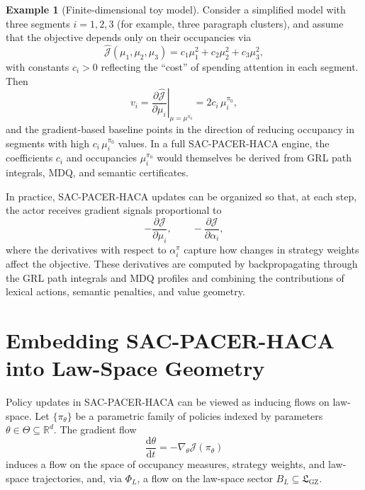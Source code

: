 \documentclass[11pt]{book}
\theoremstyle{plain}
\theoremstyle{definition}
\newtheorem{example}[theorem]{Example}
\theoremstyle{remark}
\newcommand{\GZLS}{\ensuremath{\mathfrak{L}_{\mathrm{GZ}}}}       \newcommand{\GZLT}{\ensuremath{M_{!w}}}                           \newcommand{\GZLOC}{\ensuremath{A_M}}                             \newcommand{\GZLC}{\ensuremath{\omega_{\mathrm{law}}}}            \newcommand{\GZLCurv}{\ensuremath{\mathcal{F}_{\mathrm{law}}}}
\begin{document}
\begin{example}[Finite-dimensional toy model]
\label{ex:toy-model-mu-v}
Consider a simplified model with three segments $i=1,2,3$ (for
example, three paragraph clusters), and assume that the objective
depends only on their occupancies via
\[
  \widehat{\mathcal{J}}(\mu_1,\mu_2,\mu_3)
  =
  c_1\mu_1^2 + c_2\mu_2^2 + c_3\mu_3^2,
\]
with constants $c_i>0$ reflecting the ``cost'' of spending attention
in each segment. Then
\[
  v_i
  =
  \left.\frac{\partial\widehat{\mathcal{J}}}{\partial\mu_i}\right|_{\mu=\mu^{\pi_0}}
  =
  2c_i\,\mu_i^{\pi_0},
\]
and the gradient-based baseline points in the direction of reducing
occupancy in segments with high $c_i\,\mu_i^{\pi_0}$ values. In a
full SAC-PACER-HACA engine, the coefficients $c_i$ and occupancies
$\mu_i^{\pi_0}$ would themselves be derived from GRL path integrals,
MDQ, and semantic certificates.
\end{example}

In practice, SAC-PACER-HACA updates can be organized so that, at each
step, the actor receives gradient signals proportional to
\[
  -\frac{\partial\mathcal{J}}{\partial\mu_i},
  \qquad
  -\frac{\partial\mathcal{J}}{\partial\alpha_i},
\]
where the derivatives with respect to $\alpha_i^\pi$ capture how
changes in strategy weights affect the objective. These derivatives
are computed by backpropagating through the GRL path integrals and
MDQ profiles and combining the contributions of lexical actions,
semantic penalties, and value geometry.



\section[Embedding SAC-PACER-HACA into Law-Space Geometry]{Embedding SAC-PACER-HACA into Law-Space Geometry}


Policy updates in SAC-PACER-HACA can be viewed as inducing flows on
law-space. Let $\{\pi_\theta\}$ be a parametric family of policies
indexed by parameters $\theta\in\Theta\subseteq\mathbb{R}^d$. The
gradient flow
\[
  \frac{\mathrm{d}\theta}{\mathrm{d}t}
  = -\nabla_\theta\mathcal{J}(\pi_\theta)
\]
induces a flow on the space of occupancy measures, strategy weights,
and law-space trajectories, and, via $\Phi_L$, a flow on the law-space
sector $B_L\subseteq\GZLS$.
\end{document}
